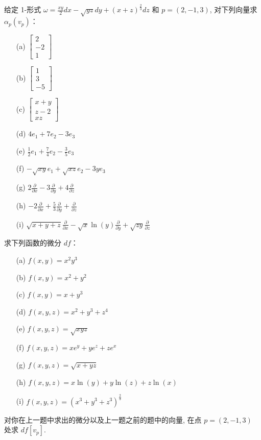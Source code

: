 \begin{question}\label{q:2-31}
给定 1-形式 $\omega=\frac{xy}{2}dx-\sqrt{yz}dy+(x+z)^\frac23dz$ 和 $p=(2,-1,3)$, 对下列向量求 $\alpha_p(v_p)$：
\begin{enumerate}
  \item[(a)] $\begin{bmatrix}2\\-2\\1\end{bmatrix}$
  \item[(b)] $\begin{bmatrix}1\\3\\-5\end{bmatrix}$
  \item[(c)] $\begin{bmatrix}x+y\\z-2\\xz\end{bmatrix}$
  \item[(d)] $4e_1+7e_2-3e_3$
  \item[(e)] $\frac12e_1+\frac74e_2-\frac35e_3$
  \item[(f)] $-\sqrt{xy}e_1+\sqrt{xz}e_2-3ye_3$
  \item[(g)] $2\frac{\partial}{\partial x}-3\frac{\partial}{\partial y}+4\frac{\partial}{\partial z}$
  \item[(h)] $-2\frac{\partial}{\partial x}+\frac53\frac{\partial}{\partial y}+\frac{\partial}{\partial z}$
  \item[(i)] $\sqrt{x+y+z}\frac{\partial}{\partial x}-\sqrt{x}\ln(y)\frac{\partial}{\partial y}+\sqrt{zy}\frac{\partial}{\partial z}$
\end{enumerate}
\end{question}

\begin{question}\label{q:2-32}
求下列函数的微分 $df$：
\begin{enumerate}
  \item[(a)] $f(x,y)=x^2y^3$
  \item[(b)] $f(x,y)=x^2+y^2$
  \item[(c)] $f(x,y)=x+y^3$
  \item[(d)] $f(x,y,z)=x^2+y^3+z^4$
  \item[(e)] $f(x,y,z)=\sqrt{xyz}$
  \item[(f)] $f(x,y,z)=xe^y+ye^z+ze^x$
  \item[(g)] $f(x,y,z)=\sqrt{x+yz}$
  \item[(h)] $f(x,y,z)=x\ln(y)+y\ln(z)+z\ln(x)$
  \item[(i)] $f(x,y,z)=\left(x^3+y^3+z^3\right)^\frac23$
\end{enumerate}
\end{question}

\begin{question}\label{q:2-33}
对你在上一题中求出的微分以及上一题之前的题中的向量, 在点 $p=(2,-1,3)$ 处求 $df[v_p]$.
\end{question}
